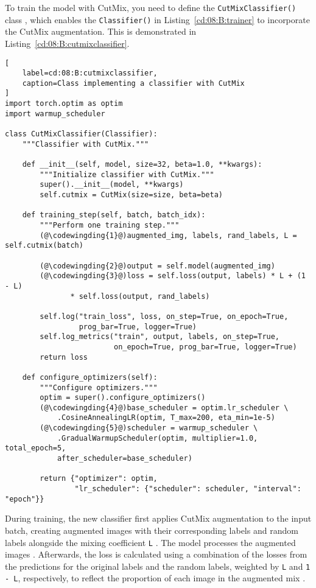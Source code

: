 To train the model with CutMix, you need to define the \lstinline{CutMixClassifier()} class , which enables the \lstinline{Classifier()} in Listing~\ref{cd:08:B:trainer} to incorporate the CutMix augmentation. This is demonstrated in Listing~\ref{cd:08:B:cutmixclassifier}.
\begin{lstlisting}[
    label=cd:08:B:cutmixclassifier,
    caption=Class implementing a classifier with CutMix
]
import torch.optim as optim
import warmup_scheduler

class CutMixClassifier(Classifier):
    """Classifier with CutMix."""

    def __init__(self, model, size=32, beta=1.0, **kwargs):
        """Initialize classifier with CutMix."""
        super().__init__(model, **kwargs)
        self.cutmix = CutMix(size=size, beta=beta)

    def training_step(self, batch, batch_idx):
        """Perform one training step."""
        (@\codewingding{1}@)augmented_img, labels, rand_labels, L = self.cutmix(batch)

        (@\codewingding{2}@)output = self.model(augmented_img)
        (@\codewingding{3}@)loss = self.loss(output, labels) * L + (1 - L) 
               * self.loss(output, rand_labels)

        self.log("train_loss", loss, on_step=True, on_epoch=True,
                 prog_bar=True, logger=True)
        self.log_metrics("train", output, labels, on_step=True, 
                         on_epoch=True, prog_bar=True, logger=True)
        return loss

    def configure_optimizers(self):
        """Configure optimizers."""
        optim = super().configure_optimizers()
        (@\codewingding{4}@)base_scheduler = optim.lr_scheduler \
            .CosineAnnealingLR(optim, T_max=200, eta_min=1e-5)
        (@\codewingding{5}@)scheduler = warmup_scheduler \
            .GradualWarmupScheduler(optim, multiplier=1.0, total_epoch=5, 
            after_scheduler=base_scheduler)

        return {"optimizer": optim,
                "lr_scheduler": {"scheduler": scheduler, "interval": "epoch"}}
\end{lstlisting}
During training,  the new classifier first applies CutMix augmentation to the input batch, creating augmented images with their corresponding labels and random labels alongside the mixing coefficient \lstinline{L} . The model processes the augmented images . Afterwards, the loss is calculated using a combination of the losses from the predictions for the original labels and the random labels, weighted by \lstinline{L} and \lstinline{1 - L}, respectively, to reflect the proportion of each image in the augmented mix . 

